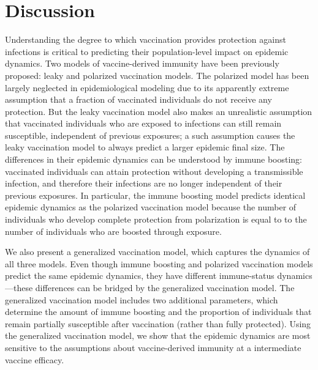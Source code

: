 \documentclass[12pt]{article}
\begin{document}
\section*{Discussion}

Understanding the degree to which vaccination provides protection against infections is critical to predicting their population-level impact on epidemic dynamics.
Two models of vaccine-derived immunity have been previously proposed: leaky and polarized vaccination models.
The polarized model has been largely neglected in epidemiological modeling due to its apparently extreme assumption that a fraction of vaccinated individuals do not receive any protection. 
But the leaky vaccination model also makes an unrealistic assumption that vaccinated individuals who are exposed to infections can still remain susceptible, independent of previous exposures; 
a such assumption causes the leaky vaccination model to always predict a larger epidemic final size.
The differences in their epidemic dynamics can be understood by immune boosting: vaccinated individuals can attain protection without developing a transmissible infection, and therefore their infections are no longer independent of their previous exposures.
In particular, the immune boosting model predicts identical epidemic dynamics as the polarized vaccination model because the number of individuals who develop complete protection from polarization is equal to to the number of individuals who are boosted through exposure.

We also present a generalized vaccination model, which captures the dynamics of all three models.
Even though immune boosting and polarized vaccination models predict the same epidemic dynamics, they have different immune-status dynamics---these differences can be bridged by the generalized vaccination model.
The generalized vaccination model includes two additional parameters, which determine the amount of immune boosting and the proportion of individuals that remain partially susceptible after vaccination (rather than fully protected).
Using the generalized vaccination model, we show that the epidemic dynamics are most sensitive to the assumptions about vaccine-derived immunity at a intermediate vaccine efficacy.
\end{document}
